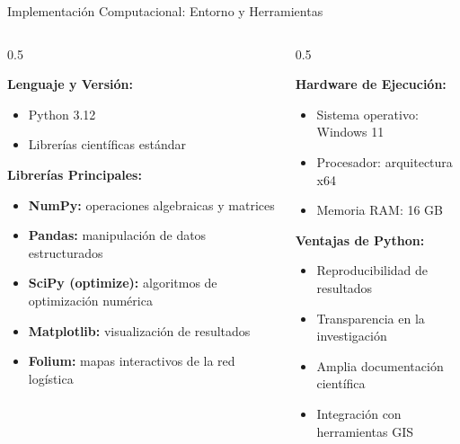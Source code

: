 \documentclass[
  ignorenonframetext,
]{beamer}
\begin{document}
\begin{frame}{Implementación Computacional: Entorno y Herramientas}
\label{implementaciuxf3n-computacional-entorno-y-herramientas}
\begin{columns}[T]
\begin{column}{0.5\linewidth}
\justifying
{}

\textbf{Lenguaje y Versión:}

\begin{itemize}
\item Python 3.12
\item Librerías científicas estándar
\end{itemize}

\vspace{0.3cm}

\textbf{Librerías Principales:}

\begin{itemize}
\item \textbf{NumPy:} operaciones algebraicas y matrices
\item \textbf{Pandas:} manipulación de datos estructurados
\item \textbf{SciPy (optimize):} algoritmos de optimización numérica
\item \textbf{Matplotlib:} visualización de resultados
\item \textbf{Folium:} mapas interactivos de la red logística
\end{itemize}
\end{column}

\begin{column}{0.5\linewidth}
\justifying
{}

\textbf{Hardware de Ejecución:}

\begin{itemize}
\item Sistema operativo: Windows 11
\item Procesador: arquitectura x64
\item Memoria RAM: 16 GB
\end{itemize}

\vspace{0.5cm}

\textbf{Ventajas de Python:}

\begin{itemize}
\item Reproducibilidad de resultados
\item Transparencia en la investigación
\item Amplia documentación científica
\item Integración con herramientas GIS
\end{itemize}
\end{column}
\end{columns}
\end{frame}
\end{document}
